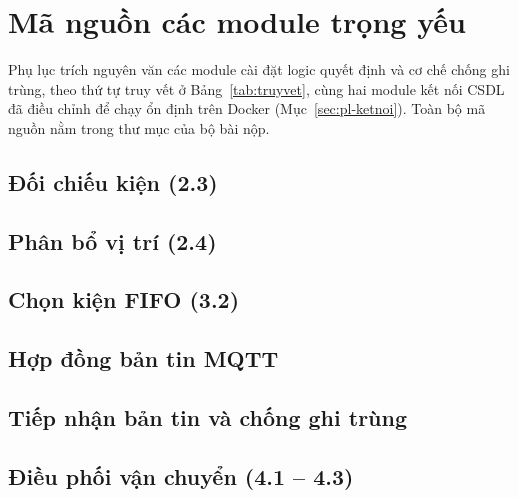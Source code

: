 \chapter{Mã nguồn các module trọng yếu}
\label{app:maguon}

Phụ lục trích nguyên văn các module cài đặt logic quyết định và cơ chế chống ghi trùng, theo thứ tự truy vết ở Bảng~\ref{tab:truyvet}, cùng hai module kết nối CSDL đã điều chỉnh để chạy ổn định trên Docker (Mục~\ref{sec:pl-ketnoi}). Toàn bộ mã nguồn nằm trong thư mục  của bộ bài nộp.

\section{Đối chiếu kiện (2.3)}

\section{Phân bổ vị trí (2.4)}

\section{Chọn kiện FIFO (3.2)}

\section{Hợp đồng bản tin MQTT}

\section{Tiếp nhận bản tin và chống ghi trùng}

\section{Điều phối vận chuyển (4.1 -- 4.3)}

